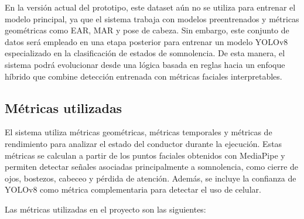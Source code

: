 \documentclass[conference]{IEEEtran}
\begin{document}
En la versión actual del prototipo, este dataset aún no se utiliza para entrenar el modelo principal, ya que el sistema trabaja con modelos preentrenados y métricas geométricas como EAR, MAR y pose de cabeza. Sin embargo, este conjunto de datos será empleado en una etapa posterior para entrenar un modelo YOLOv8 especializado en la clasificación de estados de somnolencia. De esta manera, el sistema podrá evolucionar desde una lógica basada en reglas hacia un enfoque híbrido que combine detección entrenada con métricas faciales interpretables.

\subsection{Métricas utilizadas}

El sistema utiliza métricas geométricas, métricas temporales y métricas de rendimiento para analizar el estado del conductor durante la ejecución. Estas métricas se calculan a partir de los puntos faciales obtenidos con MediaPipe y permiten detectar señales asociadas principalmente a somnolencia, como cierre de ojos, bostezos, cabeceo y pérdida de atención. Además, se incluye la confianza de YOLOv8 como métrica complementaria para detectar el uso de celular.

Las métricas utilizadas en el proyecto son las siguientes:
\end{document}
